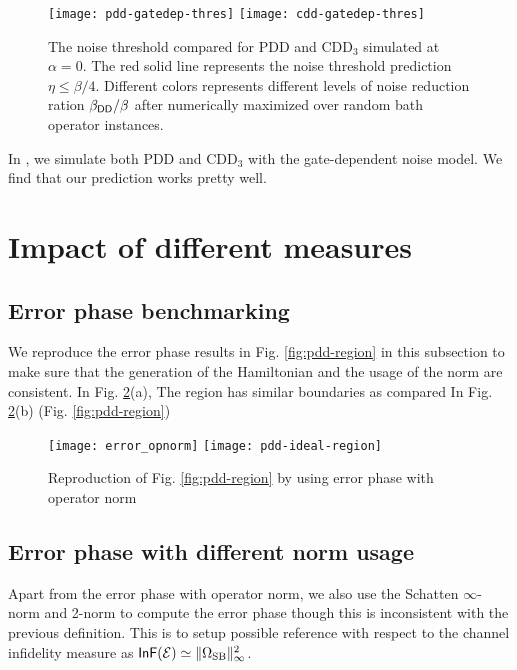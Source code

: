 \documentclass[aps,pra,reprint,superscriptaddress]{revtex4-2}
\begin{document}
 \begin{figure}[htbp]
    \centering
    \texttt{[image: pdd-gatedep-thres]}\quad
    \texttt{[image: cdd-gatedep-thres]}
    \caption{The noise threshold compared for PDD and $\mathrm{CDD}_3$ simulated at $\alpha=0$.
    The red solid line represents the noise threshold prediction $\eta\le\beta/4$. Different colors represents different levels of noise reduction ration $\beta_{\mathsf{DD}}/\beta$ after numerically maximized over random bath operator instances.
    }
    \label{fig:cdd-gatedep-thres}
\end{figure}

In , we simulate both PDD and $\mathrm{CDD}_3$ with the gate-dependent noise model. We find that our prediction works pretty well. 


\section{Impact of different measures}
\subsection{Error phase benchmarking}
We reproduce the error phase results in Fig. \ref{fig:pdd-region} in this subsection to make sure that the generation of the Hamiltonian and the usage of the norm are consistent. In Fig. \ref{fig:pdd-region-check-opnorm}(a), The region has similar boundaries as compared In Fig. \ref{fig:pdd-region-check-opnorm}(b) (Fig. \ref{fig:pdd-region})
\begin{figure}
    \centering
    \texttt{[image: error\_opnorm]}
    \texttt{[image: pdd-ideal-region]}
    \caption{Reproduction of Fig. \ref{fig:pdd-region} by using error phase with operator norm}
    \label{fig:pdd-region-check-opnorm}
\end{figure}

\subsection{Error phase with different norm usage}
Apart from the error phase with operator norm, we also use the Schatten $\infty$-norm and 2-norm to compute the error phase though this is inconsistent with the previous definition. This is to setup possible reference with respect to the channel infidelity measure as $\operatorname{\mathsf{InF}}(\mathcal{E})\simeq \Vert {\Omega_{\mathrm{SB}}} \Vert_\infty^2$. 
\end{document}
